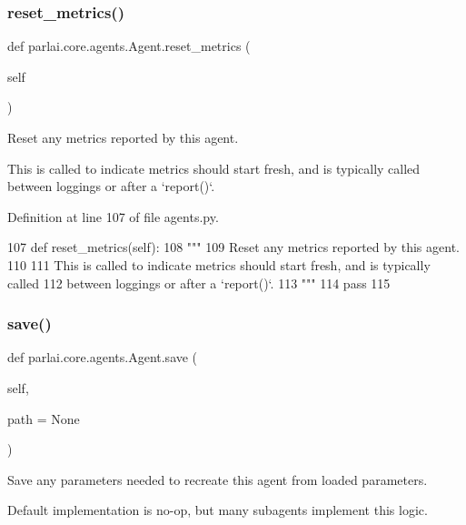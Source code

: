 \subsubsection{\texorpdfstring{reset\+\_\+metrics()}{reset\_metrics()}}
{\footnotesize\ttfamily def parlai.\+core.\+agents.\+Agent.\+reset\+\_\+metrics (\begin{DoxyParamCaption}\item[{}]{self }\end{DoxyParamCaption})}

\begin{DoxyVerb}Reset any metrics reported by this agent.

This is called to indicate metrics should start fresh, and is typically called
between loggings or after a `report()`.
\end{DoxyVerb}
 

Definition at line 107 of file agents.\+py.


\begin{DoxyCode}
107     \textcolor{keyword}{def }reset\_metrics(self):
108         \textcolor{stringliteral}{"""}
109 \textcolor{stringliteral}{        Reset any metrics reported by this agent.}
110 \textcolor{stringliteral}{}
111 \textcolor{stringliteral}{        This is called to indicate metrics should start fresh, and is typically called}
112 \textcolor{stringliteral}{        between loggings or after a `report()`.}
113 \textcolor{stringliteral}{        """}
114         \textcolor{keywordflow}{pass}
115 
\end{DoxyCode}
\mbox{\label{classparlai_1_1core_1_1agents_1_1Agent_a51e706e3e5389c9b48c7a1589d97ec99}} 
\subsubsection{\texorpdfstring{save()}{save()}}
{\footnotesize\ttfamily def parlai.\+core.\+agents.\+Agent.\+save (\begin{DoxyParamCaption}\item[{}]{self,  }\item[{}]{path = {\ttfamily None} }\end{DoxyParamCaption})}

\begin{DoxyVerb}Save any parameters needed to recreate this agent from loaded parameters.

Default implementation is no-op, but many subagents implement this logic.
\end{DoxyVerb}
 

